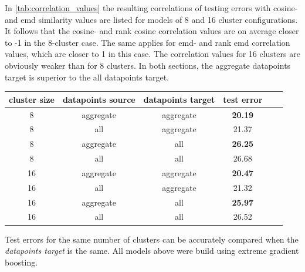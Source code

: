 	In \cref{tab:correlation_values} the resulting correlations of testing errors with cosine- and emd similarity values are listed for models of 8 and 16 cluster configurations. It follows that the cosine- and rank cosine correlation values are on average closer to -1 in the 8-cluster case. The same applies for emd- and rank emd correlation values, which are closer to 1 in this case. The correlation values for 16 clusters are obviously weaker than for 8 clusters. In both sections, the aggregate datapoints target is superior to the all datapoints target.
	
	\begin{table}[!ht]
		{\begin{tabular}{ | c | c | c | c | c | c | }
				\hline
				{cluster size} & {datapoints source} & {datapoints target} & {test error} \\ \hline
				8	&	aggregate 	&	aggregate 	& 	\textbf{20.19} 	\\ \hline
				8	&	all 		&	aggregate 	& 	21.37	\\ \hline \hline
				8	&	aggregate 	&	all 		& 	\textbf{26.25}	\\ \hline
				8	&	all			& 	all 		&	26.68	\\ \hline \hline
				16	&	aggregate	& 	aggregate 	&	\textbf{20.47}	\\ \hline
				16	&	all			& 	aggregate 	& 	21.32	\\ \hline \hline
				16	&	aggregate	& 	all 		& 	\textbf{25.97}	\\ \hline
				16	&	all			&	all 		&	26.52	\\ \hline \hline
		\end{tabular}}
		\label{tab:train_test_errors}
		\begin{tabnote}
			Test errors for the same number of clusters can be accurately compared when the \textit{datapoints target} is the same. All models above were build using extreme gradient boosting.
		\end{tabnote}
	\end{table}
		
